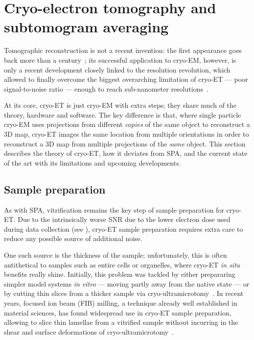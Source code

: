 \chapter[Cryo-ET and STA]{Cryo-electron tomography and subtomogram averaging}

Tomographic reconstruction is not a recent invention: the first appearance goes back more than a century~\cite{jDeterminationFunctionsTheir1917}; its successful application to cryo-EM, however, is only a recent development closely linked to the resolution revolution, which allowed to finally overcome the biggest overarching limitation of cryo-ET --- poor signal-to-noise ratio --- enough to reach sub-nanometer resolutions~\cite{lucicCryoelectronTomographyChallenge2013,turkPromiseChallengesCryoelectron2020}.

At its core, cryo-ET is just cryo-EM with extra steps; they share much of the theory, hardware and software.
The key difference is that, where single particle cryo-EM uses projections from different \textit{copies} of the same object to reconstruct a 3D map, cryo-ET images the same location from multiple orientations in order to reconstruct a 3D map from multiple projections of the \textit{same} object.
This section describes the theory of cryo-ET, how it deviates from SPA, and the current state of the art with its limitations and upcoming developments.

\section{Sample preparation}
As with SPA, vitrification remains the key step of sample preparation for cryo-ET.
Due to the intrinsically worse SNR due to the lower electron dose used during data collection (see ), cryo-ET sample preparation requires extra care to reduce any possible source of additional noise.

One such source is the thickness of the sample; unfortunately, this is often antithetical to samples such as entire cells or organelles, where cryo-ET \textit{in situ} benefits really shine.
Initially, this problem was tackled by either prepararing simpler model systems \textit{in vitro} --- moving partly away from the native state --- or by cutting thin slices from a thicker sample via cryo-ultramicrotomy~\cite{peaseElectronMicroscopyUltramicrotomy1981}.
In recent years, focused ion beam (FIB) milling, a technique already well established in material sciences, has found widespread use in cryo-ET sample preparation, allowing to slice thin lamellae from a vitrified sample without incurring in the shear and surface deformations of cryo-ultramicrotomy~\cite{markoFocusedionbeamThinningFrozenhydrated2007}.

